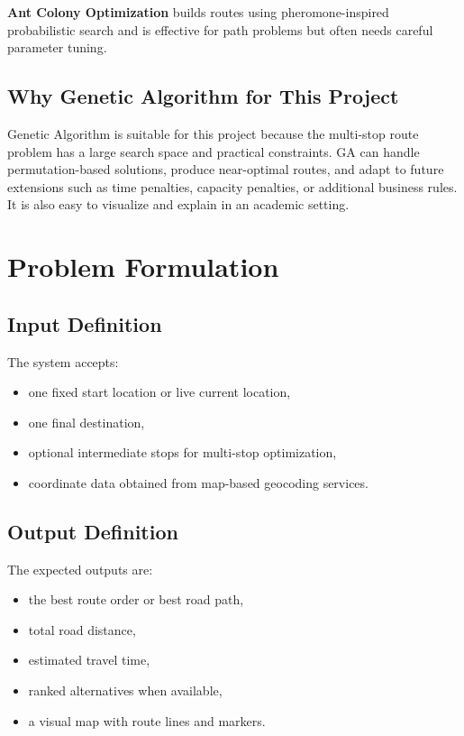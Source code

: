\textbf{Ant Colony Optimization} builds routes using pheromone-inspired probabilistic search and is effective for path problems but often needs careful parameter tuning.

\subsection{Why Genetic Algorithm for This Project}
Genetic Algorithm is suitable for this project because the multi-stop route problem has a large search space and practical constraints. GA can handle permutation-based solutions, produce near-optimal routes, and adapt to future extensions such as time penalties, capacity penalties, or additional business rules. It is also easy to visualize and explain in an academic setting.

\section{Problem Formulation}
\subsection{Input Definition}
The system accepts:
\begin{itemize}[leftmargin=1.5em]
    \item one fixed start location or live current location,
    \item one final destination,
    \item optional intermediate stops for multi-stop optimization,
    \item coordinate data obtained from map-based geocoding services.
\end{itemize}

\subsection{Output Definition}
The expected outputs are:
\begin{itemize}[leftmargin=1.5em]
    \item the best route order or best road path,
    \item total road distance,
    \item estimated travel time,
    \item ranked alternatives when available,
    \item a visual map with route lines and markers.
\end{itemize}


